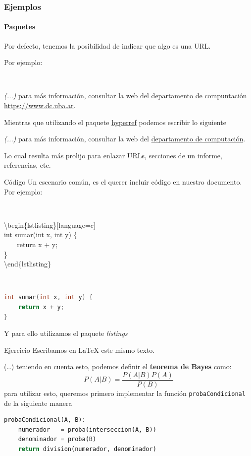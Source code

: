 \begin{frame}
\frametitle{Ejemplos}
\framesubtitle{Paquetes}

Por defecto, tenemos la posibilidad de indicar que algo es una URL. 

Por ejemplo:

\

\begin{center}
\textit{(...)} para más información, consultar la web del departamento de compuntación \url{https://www.dc.uba.ar}.
\end{center}

\pause

Mientras que utilizando el paquete \href{https://ctan.org/pkg/hyperref}{hyperref} podemos escribir lo siguiente


\begin{center}
\textit{(...)} para más información, consultar la web del \href{https://www.dc.uba.ar}{departamento de computación}.
\end{center}

Lo cual resulta más prolijo para enlazar URLs, secciones de un informe, referencias, etc.

\end{frame}

\begin{frame}[fragile]{Código}
Un escenario común, es el querer incluir código en nuestro documento. Por ejemplo:

\

\textbackslash begin\{lstlisting\}[language=c] \\
int sumar(int x, int y) \{ \\
$~~~~~~~$ return x + y; \\
\} \\
\textbackslash end\{lstlisting\}

\

\begin{lstlisting}[language=c]
int sumar(int x, int y) {
    return x + y;
}
\end{lstlisting}

Y para ello utilizamos el paquete \emph{listings}

\end{frame}

\begin{frame}[fragile]{Ejercicio}
    Escribamos en \LaTeX{}  este mismo texto. 
    
    \begin{tcolorbox}[colframe=color1]
        (\ldots) teniendo en cuenta esto, podemos definir el \textbf{teorema de Bayes} como:
        \[P(A|B) = \frac{P(A|B)P(A)}{P(B)}\]
        para utilizar esto, queremos primero implementar la función \texttt{probaCondicional} de la siguiente manera
\begin{lstlisting}[language=python]
probaCondicional(A, B):
    numerador   = proba(interseccion(A, B))
    denominador = proba(B)       
    return division(numerador, denominador)
\end{lstlisting}
\end{tcolorbox}
    
\end{frame}

